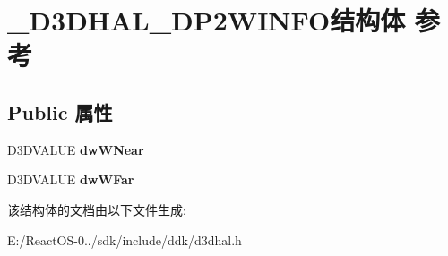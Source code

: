 \hypertarget{struct___d3_d_h_a_l___d_p2_w_i_n_f_o}{}\section{\+\_\+\+D3\+D\+H\+A\+L\+\_\+\+D\+P2\+W\+I\+N\+F\+O结构体 参考}
\label{struct___d3_d_h_a_l___d_p2_w_i_n_f_o}
\subsection*{Public 属性}
\begin{DoxyCompactItemize}
\item 
\mbox{\label{struct___d3_d_h_a_l___d_p2_w_i_n_f_o_a59b8ae6038497a21c568ad6425c08b33}} 
D3\+D\+V\+A\+L\+UE {\bfseries dw\+W\+Near}
\item 
\mbox{\label{struct___d3_d_h_a_l___d_p2_w_i_n_f_o_afff0123e21149aed109e18f3454a2575}} 
D3\+D\+V\+A\+L\+UE {\bfseries dw\+W\+Far}
\end{DoxyCompactItemize}


该结构体的文档由以下文件生成\+:\begin{DoxyCompactItemize}
\item 
E\+:/\+React\+O\+S-\/0../sdk/include/ddk/d3dhal.\+h\end{DoxyCompactItemize}
